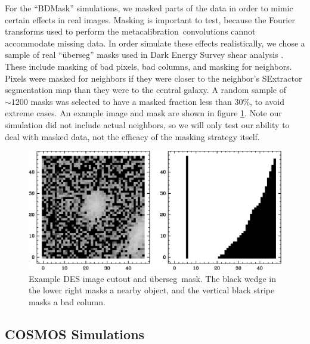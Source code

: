 \documentclass[usegraphicx,usenatbib]{mn2e}
\newcommand{\uberseg}{{\"u}berseg}
\newcommand{\mcal}{metacalibration}
\begin{document}
For the ``BDMask'' simulations, we masked parts of the data in order to mimic
certain effects in real images. Masking is important to test, because the
Fourier transforms used to perform the \mcal\ convolutions cannot accommodate
missing data.  In order simulate these effects realistically, we chose a sample
of real ``\uberseg'' masks used in Dark Energy Survey shear analysis
\citep{DESSVShear}.  These include masking of bad pixels, bad columns, and
masking for neighbors.  Pixels were masked for neighbors if they were closer to
the neighbor's SExtractor \citep{Bertin96} segmentation map than they were to
the central galaxy.  A random sample of $\sim 1200$ masks was selected to have
a masked fraction less than 30\%, to avoid extreme cases.  An example image and
mask are shown in figure \ref{fig:mask}.  Note our simulation did not include
actual neighbors, so we will only test our ability to deal with masked data,
not the efficacy of the masking strategy itself.

\begin{figure}
    \centering
    \includegraphics[scale=0.45]{DES0508-5540-uberseg-013916.eps}

    \caption{Example DES image cutout and \uberseg\ mask.  The black wedge in
the lower right masks a nearby object, and the vertical black stripe masks a
bad column. }

\label{fig:mask}
\end{figure}


\subsection{COSMOS Simulations}
\end{document}
